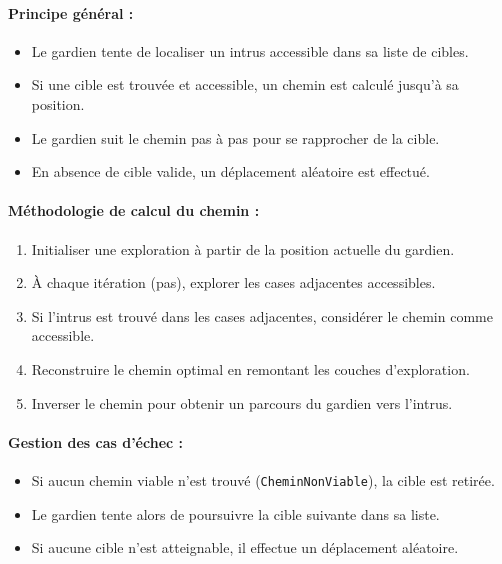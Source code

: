 \paragraph{Principe général :}
\begin{itemize}
    \item Le gardien tente de localiser un intrus accessible dans sa liste de cibles.
    \item Si une cible est trouvée et accessible, un chemin est calculé jusqu'à sa position.
    \item Le gardien suit le chemin pas à pas pour se rapprocher de la cible.
    \item En absence de cible valide, un déplacement aléatoire est effectué.
\end{itemize}

\paragraph{Méthodologie de calcul du chemin :}
\begin{enumerate}
    \item Initialiser une exploration à partir de la position actuelle du gardien.
    \item À chaque itération (pas), explorer les cases adjacentes accessibles.
    \item Si l'intrus est trouvé dans les cases adjacentes, considérer le chemin comme accessible.
    \item Reconstruire le chemin optimal en remontant les couches d'exploration.
    \item Inverser le chemin pour obtenir un parcours du gardien vers l'intrus.
\end{enumerate}

\paragraph{Gestion des cas d'échec :}
\begin{itemize}
    \item Si aucun chemin viable n'est trouvé (\texttt{CheminNonViable}), la cible est retirée.
    \item Le gardien tente alors de poursuivre la cible suivante dans sa liste.
    \item Si aucune cible n'est atteignable, il effectue un déplacement aléatoire.
\end{itemize}

